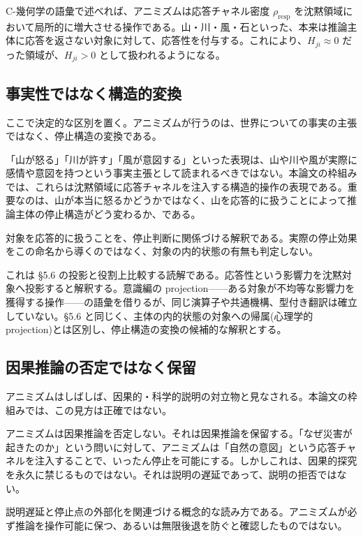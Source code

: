 C-幾何学の語彙で述べれば、アニミズムは応答チャネル密度 $\rho_{\text{resp}}$ を沈黙領域において局所的に増大させる操作である。山・川・風・石といった、本来は推論主体に応答を返さない対象に対して、応答性を付与する。これにより、$H_{ji} \approx 0$ だった領域が、$H_{ji} > 0$ として扱われるようになる。

\bigskip


\subsection{事実性ではなく構造的変換}


ここで決定的な区別を置く。アニミズムが行うのは、世界についての事実の主張ではなく、停止構造の変換である。

「山が怒る」「川が許す」「風が意図する」といった表現は、山や川や風が実際に感情や意図を持つという事実主張として読まれるべきではない。本論文の枠組みでは、これらは沈黙領域に応答チャネルを注入する構造的操作の表現である。重要なのは、山が本当に怒るかどうかではなく、山を応答的に扱うことによって推論主体の停止構造がどう変わるか、である。

対象を応答的に扱うことを、停止判断に関係づける解釈である。実際の停止効果をこの命名から導くのではなく、対象の内的状態の有無も判定しない。

これは \S{}5.6 の投影と役割上比較する読解である。応答性という影響力を沈黙対象へ投影すると解釈する。意識編の projection——ある対象が不均等な影響力を獲得する操作——の語彙を借りるが、同じ演算子や共通機構、型付き翻訳は確立していない。\S{}5.6 と同じく、主体の内的状態の対象への帰属(心理学的 projection)とは区別し、停止構造の変換の候補的な解釈とする。

\bigskip


\subsection{因果推論の否定ではなく保留}


アニミズムはしばしば、因果的・科学的説明の対立物と見なされる。本論文の枠組みでは、この見方は正確ではない。

アニミズムは因果推論を否定しない。それは因果推論を保留する。「なぜ災害が起きたのか」という問いに対して、アニミズムは「自然の意図」という応答チャネルを注入することで、いったん停止を可能にする。しかしこれは、因果的探究を永久に禁じるものではない。それは説明の遅延であって、説明の拒否ではない。

説明遅延と停止点の外部化を関連づける概念的な読み方である。アニミズムが必ず推論を操作可能に保つ、あるいは無限後退を防ぐと確認したものではない。

